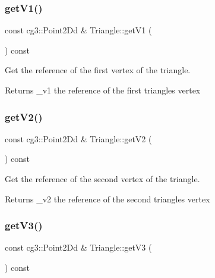 \subsubsection{\texorpdfstring{get\+V1()}{getV1()}}
{\footnotesize\ttfamily const cg3\+::\+Point2\+Dd \& Triangle\+::get\+V1 (\begin{DoxyParamCaption}{ }\end{DoxyParamCaption}) const\hspace{0.3cm}{\ttfamily [inline]}}



Get the reference of the first vertex of the triangle. 

\begin{DoxyReturn}{Returns}
\+\_\+v1 the reference of the first triangle\textquotesingle{}s vertex 
\end{DoxyReturn}
\mbox{\label{classTriangle_afd1afc04804cd49af6bf81c162b8c984}} 
\subsubsection{\texorpdfstring{get\+V2()}{getV2()}}
{\footnotesize\ttfamily const cg3\+::\+Point2\+Dd \& Triangle\+::get\+V2 (\begin{DoxyParamCaption}{ }\end{DoxyParamCaption}) const\hspace{0.3cm}{\ttfamily [inline]}}



Get the reference of the second vertex of the triangle. 

\begin{DoxyReturn}{Returns}
\+\_\+v2 the reference of the second triangle\textquotesingle{}s vertex 
\end{DoxyReturn}
\mbox{\label{classTriangle_abe96c8ea9aaf52e921b9e6420a5d6a35}} 
\subsubsection{\texorpdfstring{get\+V3()}{getV3()}}
{\footnotesize\ttfamily const cg3\+::\+Point2\+Dd \& Triangle\+::get\+V3 (\begin{DoxyParamCaption}{ }\end{DoxyParamCaption}) const\hspace{0.3cm}{\ttfamily [inline]}}




